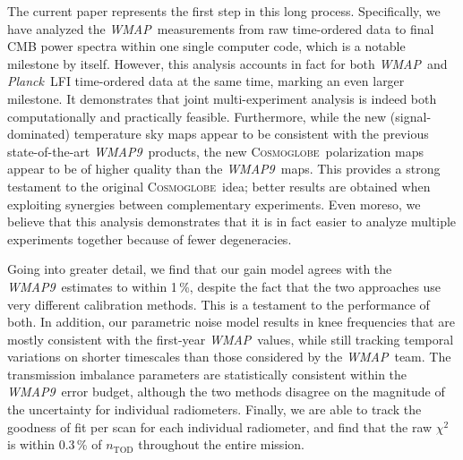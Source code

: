 \documentclass[twocolumn]{../../common/aa}
\def\WMAP{\emph{WMAP}}
\def\WMAPnine{\emph{WMAP9}}
\def\Planck{\emph{Planck}}
\newcommand{\cosmoglobe}{\textsc{Cosmoglobe}}
\begin{document}
The current paper represents the first step in this long process. Specifically, we have analyzed the \WMAP\ measurements from raw time-ordered data to final CMB power spectra within one single computer code, which is a notable milestone by itself. However, this analysis accounts in fact for both \WMAP\ and \Planck\ LFI time-ordered data at the same time, marking an even larger milestone. It demonstrates that joint multi-experiment analysis is indeed both computationally and practically feasible. Furthermore, while the new (signal-dominated) temperature sky maps appear to be consistent with the previous state-of-the-art \WMAPnine\ products, the new \cosmoglobe\ polarization maps appear to be of higher quality than the \WMAPnine\ maps. This provides a strong testament to the original \cosmoglobe\ idea; better results are obtained when exploiting synergies between complementary experiments. Even moreso, we believe that this analysis demonstrates that it is in fact easier to analyze multiple experiments together because of fewer degeneracies.

Going into greater detail, we find that our gain model agrees with the \WMAPnine\ estimates to within 1\,\%, despite the fact that the two approaches use very different calibration methods. This is a testament to the performance of both. In addition, our parametric noise model results in knee frequencies that are mostly consistent with the first-year \WMAP\ values, while still tracking temporal variations on shorter timescales than those considered by the \WMAP\ team. The transmission imbalance parameters are statistically consistent within the \WMAPnine\ error budget, although the two methods disagree on the magnitude of the uncertainty for individual radiometers. Finally, we are able to track the goodness of fit per scan for each individual radiometer, and find that the raw $\chi^2$ is within 0.3\,\% of $n_\mathrm{TOD}$ throughout the entire mission.
\end{document}
